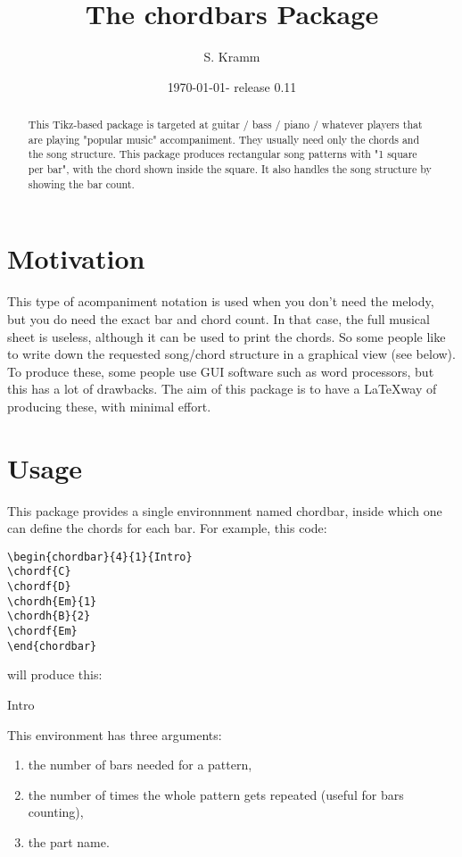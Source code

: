 \documentclass[11pt]{article}
\title{The chordbars Package}
\author{S. Kramm}
\date{\today - release 0.11}
\begin{document}
\maketitle

\begin{abstract}
This Tikz-based package is targeted at guitar / bass / piano / whatever players that are playing "popular music" accompaniment. They usually need only the chords and the song structure.
This package produces rectangular song patterns with "1 square per bar", with the chord shown inside the square.
It also handles the song structure by showing the bar count.
\end{abstract}

\section{Motivation}

This type of acompaniment notation is used when you don't need the melody, but you do need the exact bar and chord count.
In that case, the full musical sheet is useless, although it can be used to print the chords.
So some people like to write down the requested song/chord structure in a graphical view (see below). To produce these, some people use GUI software such as word processors, but this has a lot of drawbacks.
The aim of this package is to have a \LaTeX way of producing these, with minimal effort.


\section{Usage}
This package provides a single environnment named {\ttfamily chordbar}, inside which one can define the chords for each bar.
For example, this code:

\begin{lstlisting}
\begin{chordbar}{4}{1}{Intro}
\chordf{C}
\chordf{D}
\chordh{Em}{1}
\chordh{B}{2}
\chordf{Em}
\end{chordbar}
\end{lstlisting}

will produce this:

\begin{chordbar}{4}{1}{Intro}
\end{chordbar}


This environment has three arguments:
\begin{enumerate}
\item the number of bars needed for a pattern,
\item the number of times the whole pattern gets repeated (useful for bars counting),
\item the part name.
\end{enumerate}
\end{document}

